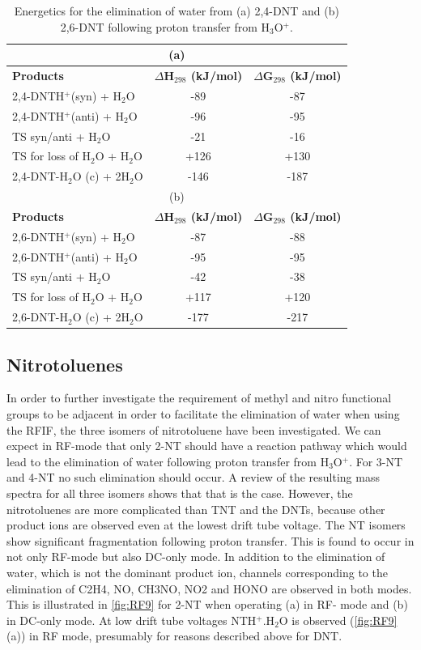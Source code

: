 \begin{table}%
\caption{Energetics for the elimination of water from (a) 2,4-DNT and (b) 2,6-DNT following proton transfer from H$_3$O$^+$.}
\label{table:RF:tab3}
\begin{tabular}{lcc}
\hline
\multicolumn{3}{c}{(a)}\\
\hline
\textbf{Products} & \textbf{$\Delta$H$_{298}$ (kJ/mol)} & \textbf{$\Delta$G$_{298}$ (kJ/mol)} \\
\hline
2,4-DNTH$^+$(syn) + H$_2$O        & -89  & -87  \\
2,4-DNTH$^+$(anti) + H$_2$O       & -96  & -95  \\
TS syn/anti + H$_2$O           & -21  & -16  \\
TS for loss of H$_2$O + H$_2$O & +126 & +130 \\
2,4-DNT-H$_2$O (c) + 2H$_2$O   & -146 & -187 \\
\hline
\multicolumn{3}{c}{(b)}\\
\hline
\textbf{Products} & \textbf{$\Delta$H$_{298}$ (kJ/mol)} & \textbf{$\Delta$G$_{298}$ (kJ/mol)} \\
\hline
2,6-DNTH$^+$(syn) + H$_2$O        & -87  & -88  \\
2,6-DNTH$^+$(anti) + H$_2$O       & -95  & -95  \\
TS syn/anti + H$_2$O           & -42  & -38  \\
TS for loss of H$_2$O + H$_2$O & +117 & +120 \\
2,6-DNT-H$_2$O (c) + 2H$_2$O   & -177 & -217 \\
\hline
\end{tabular}
\end{table}

\subsection{Nitrotoluenes}
In order to further investigate the requirement of methyl and nitro functional groups to be adjacent in order to facilitate the elimination of water when using the RFIF, the three isomers of nitrotoluene have been investigated. We can expect in RF-mode that only 2-NT should have a reaction pathway which would lead to the elimination of water following proton transfer from H$_3$O$^+$. For 3-NT and 4-NT no such elimination should occur. A review of the resulting mass spectra for all three isomers shows that that is the case. However, the nitrotoluenes are more complicated than TNT and the DNTs, because other product ions are observed even at the lowest drift tube voltage. The NT isomers show significant fragmentation following proton transfer. This is found to occur in not only RF-mode but also DC-only mode. In addition to the elimination of water, which is not the dominant product ion, channels corresponding to the elimination of C2H4, NO, CH3NO, NO2 and HONO are observed in both modes. This is illustrated in \autoref{fig:RF9} for 2-NT when operating (a) in RF- mode and (b) in DC-only mode. At low drift tube voltages NTH$^+$.H$_2$O is observed (\autoref{fig:RF9}(a)) in RF mode, presumably for reasons described above for DNT.


